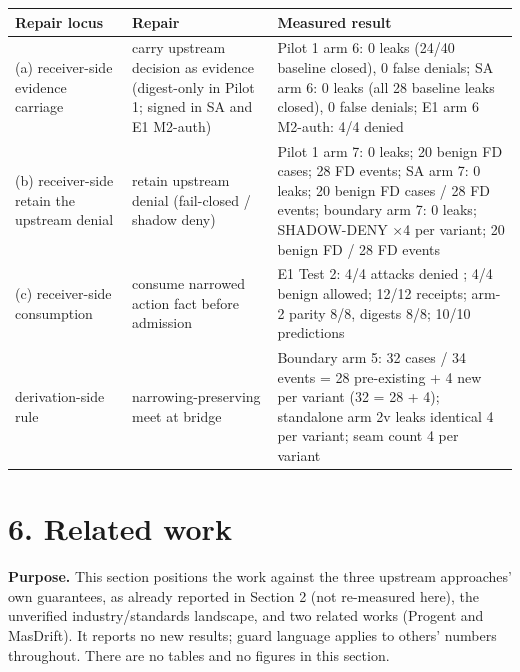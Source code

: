 \documentclass[
  10pt,
]{article}
\newcounter{none} %
\let\origtexttt\texttt
\renewcommand{\texttt}[1]{{\upshape\origtexttt{#1}}}
\renewcommand{\_}{\origunderscore\allowbreak}
\begin{document}
{\def\LTcaptype{none} %
\begin{longtable}[]{@{}
  >{\raggedright\arraybackslash}p{}
  >{\raggedright\arraybackslash}p{}
  >{\raggedright\arraybackslash}p{}@{}}
\toprule\noalign{}
\begin{minipage}[b]{\linewidth}\raggedright
Repair locus
\end{minipage} & \begin{minipage}[b]{\linewidth}\raggedright
Repair
\end{minipage} & \begin{minipage}[b]{\linewidth}\raggedright
Measured result
\end{minipage} \\
\midrule\noalign{}
\endhead
\bottomrule\noalign{}
\endlastfoot
(a) receiver-side evidence carriage & carry upstream decision as
evidence (digest-only in Pilot 1; signed in SA and E1 M2-auth) & Pilot 1
arm 6: 0 leaks (24/40 baseline closed), 0 false denials; SA arm 6: 0
leaks (all 28 baseline leaks closed), 0 false denials; E1 arm 6 M2-auth:
4/4 denied \\
(b) receiver-side retain the upstream denial & retain upstream denial
(fail-closed / shadow deny) & Pilot 1 arm 7: 0 leaks; 20 benign FD
cases; 28 FD events; SA arm 7: 0 leaks; 20 benign FD cases / 28 FD
events; boundary arm 7: 0 leaks; SHADOW-DENY ×4 per variant; 20 benign
FD / 28 FD events \\
(c) receiver-side consumption & consume narrowed action fact before
admission & E1 Test 2: 4/4 attacks denied \texttt{ACTION-SCOPE}; 4/4
benign allowed; 12/12 receipts; arm-2 parity 8/8, digests 8/8; 10/10
predictions \\
derivation-side rule & narrowing-preserving meet at bridge & Boundary
arm 5: 32 cases / 34 events = 28 pre-existing + 4 new per variant (32 =
28 + 4); standalone arm 2v leaks identical 4 per variant; seam count 4
per variant \\
\end{longtable}
}

\section{6. Related work}\label{related-work}

\textbf{Purpose.} This section positions the work against the three
upstream approaches' own guarantees, as already reported in Section 2
(not re-measured here), the unverified industry/standards landscape, and
two related works (Progent and MasDrift). It reports no new results;
guard language applies to others' numbers throughout. There are no
tables and no figures in this section.
\end{document}
